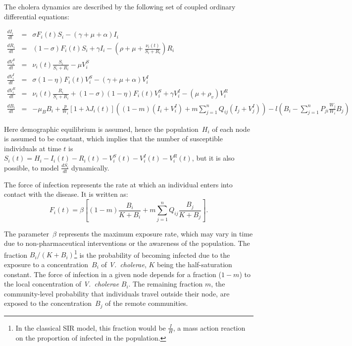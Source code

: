The cholera dynamics are described by the following set of coupled ordinary differential equations:
\begin{fullwidth}

\begingroup
\allowdisplaybreaks
\begin{eqnarray}
\frac{dI_i}{dt} &=& \sigma F_i(t) S_i - (\gamma + \mu + \alpha) I_i \label{eq:I2}\\
\frac{dR_i}{dt} &=& (1-\sigma) F_i(t) S_i + \gamma I_i - (\rho + \mu+\frac{\nu_i(t)}{S_i+R_i}) R_i \label{eq:R2}\\
\frac{dV^S_i}{dt} &=& \nu_i(t) \frac{S_i}{S_i+R_i}-\mu V^S_i \label{eq:VS2}\\
\frac{dV^I_i}{dt} &=& \sigma (1-\eta) F_i(t) V^S_i - (\gamma + \mu + \alpha) V^I_i \label{eq:VI2}\\
\frac{dV^R_i}{dt} &=& \nu_i(t) \frac{R_i}{S_i+R_i} + (1-\sigma) (1-\eta) F_i(t) V^S_i + \gamma V^I_i - (\mu+\rho_v) V^R_i \label{eq:VR2}\\
\frac{dB_i}{dt} &=& - \mu_B B_i +\frac{p}{W_i}\left[1 + \lambda J_i(t) \right] \left((1-m)(I_i +V_i^I)+m \sum_{j=1}^n Q_{ij} (I_j +V_j^I)\right)-  l \left( B_i - \sum_{j=1}^n P_{ji} \frac{W_j}{W_i} B_j \right)
\end{eqnarray}
\endgroup
\end{fullwidth}
Here demographic equilibrium is assumed, hence the population~$H_i$ of each node is assumed to be constant, which implies that the number of susceptible individuals at time $t$ is $S_i(t) = H_i - I_i(t) - R_i(t) - V_i^S(t) - V^I_i(t) - V_i^R(t)$, but it is also possible, to model $\frac{dS_i}{dt}$ dynamically.   

The force of infection represents the rate at which an individual enters into contact with the disease. It is written as:
\begin{equation}
F_i(t) = \beta \left[ (1 - m) \frac{B_i}{K + B_i} + m \sum_{j=1}^n Q_{ij} \frac{B_j}{K + B_j} \right].
\label{force}
\end{equation}

The parameter~$\beta$ represents the maximum exposure rate, which may vary in time due to non-pharmaceutical interventions or the awareness of the population\cite{Bertuzzo:ProbabilityExtinctionHaiti:2016}. The fraction $B_{i}/(K+B_{i})$\footnote{In the classical SIR model, this fraction would be $\frac{I}{H}$, a mass action reaction on the proportion of infected in the population.} is the probability of becoming infected due to the exposure to a concentration~$B_i$ of \textit{V.~cholerae}, $K$ being the half-saturation constant\cite{Codeco:EndemicEpidemicDynamics:2001}. The force of infection in a given node depends for a fraction ($1-m$) to the local concentration of \textit{V.~cholerae} $B_i$. The remaining fraction $m$, the community-level probability that individuals travel outside their node, are exposed to the concentration~$B_j$ of the remote communities. 

